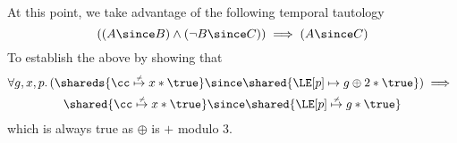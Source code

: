 At this point, we take advantage of the following temporal tautology
\begin{equation}
((A \since B) \land (\neg B \since C)) \implies (A \since C)
\end{equation}
To establish the above by showing that 
\begin{multline}
\forall g,x,p.\, 
(\shareds{\cc\nmapsto x * \true}  
\since
\shared{\LE[p] \mapsto g \oplus 2 * \true})
\implies \mbox{}\\
\shared{\cc \nmapsto x * \true} \since \shared{\LE[p] \nmapsto g * \true}
\end{multline}
which is always true as $\oplus$ is $+$ modulo $3$.



%
%
%
%
%
%
%
%
